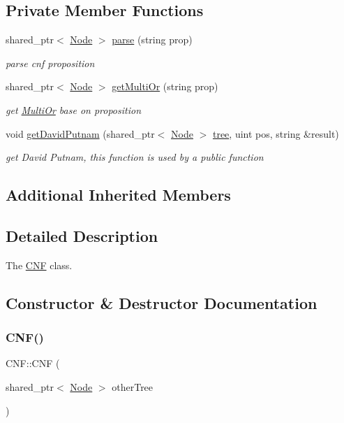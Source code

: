 \subsection*{Private Member Functions}
\begin{DoxyCompactItemize}
\item 
shared\+\_\+ptr$<$ \hyperlink{class_node}{Node} $>$ \hyperlink{class_c_n_f_a5232071e600e1bfbb76ad7d0e10d7d92}{parse} (string prop)
\begin{DoxyCompactList}\small\item\em parse cnf proposition \end{DoxyCompactList}\item 
shared\+\_\+ptr$<$ \hyperlink{class_node}{Node} $>$ \hyperlink{class_c_n_f_af2c396e921388daa2e99b6fef25b6697}{get\+Multi\+Or} (string prop)
\begin{DoxyCompactList}\small\item\em get \hyperlink{class_multi_or}{Multi\+Or} base on proposition \end{DoxyCompactList}\item 
void \hyperlink{class_c_n_f_a0ae7d61f4d57fca35ff619af3300e63c}{get\+David\+Putnam} (shared\+\_\+ptr$<$ \hyperlink{class_node}{Node} $>$ \hyperlink{class_tree_a9c0875a8767528453814b8e3daf8f9af}{tree}, uint pos, string \&result)
\begin{DoxyCompactList}\small\item\em get David Putnam, this function is used by a public function \end{DoxyCompactList}\end{DoxyCompactItemize}
\subsection*{Additional Inherited Members}


\subsection{Detailed Description}
The \hyperlink{class_c_n_f}{C\+NF} class. 

\subsection{Constructor \& Destructor Documentation}
\mbox{\label{class_c_n_f_af775e3be36e475027355d21e9ba43166}} 
\subsubsection{\texorpdfstring{C\+N\+F()}{CNF()}\hspace{0.1cm}{\footnotesize\ttfamily [1/2]}}
{\footnotesize\ttfamily C\+N\+F\+::\+C\+NF (\begin{DoxyParamCaption}\item[{shared\+\_\+ptr$<$ \hyperlink{class_node}{Node} $>$}]{other\+Tree }\end{DoxyParamCaption})}



